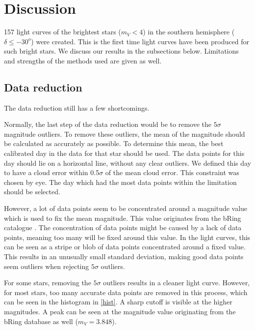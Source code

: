 \documentclass{aa}
\begin{document}
  
\section{Discussion}
\label{sec:discussion}

157 light curves of the brightest stars ($m_V < 4$) in the southern hemisphere ($\delta \leq -30^o$) were created. This is the first time light curves have been produced for such bright stars. We discuss our results in the subsections below. Limitations and strengths of the methods used are given as well.

\subsection{Data reduction}
\label{sec:discdatared}
The data reduction still has a few shortcomings.

Normally, the last step of the data reduction would be to remove the $5 \sigma$ magnitude outliers. To remove these outliers, the mean of the magnitude should be calculated as accurately as possible. To determine this mean, the best calibrated day in the data for that star should be used. The data points for this day should lie on a horizontal line, without any clear outliers. We defined this day to have a cloud error within 0.5$\sigma$ of the mean cloud error. This constraint was chosen by eye. The day which had the most data points within the limitation should be selected.

However, a lot of data points seem to be concentrated around a magnitude value which is used to fix the mean magnitude. This value originates from the bRing catalogue \citep{Talens_2018}. The concentration of data points might be caused by a lack of data points, meaning too many will be fixed around this value. In the light curves, this can be seen as a stripe or blob of data points concentrated around a fixed value. This results in an unusually small standard deviation, making good data points seem outliers when rejecting $5\sigma$ outliers.

For some stars, removing the $5 \sigma$ outliers results in a cleaner light curve. However, for most stars, too many accurate data points are removed in this process, which can be seen in the histogram in \ref{hist}. A sharp cutoff is visible at the higher magnitudes. A peak can be seen at the magnitude value originating from the bRing database as well ($m_V = 3.848$).
\end{document}
